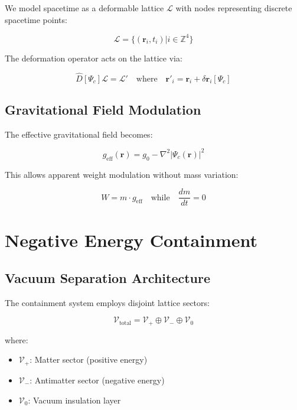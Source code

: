 \documentclass{article}
\begin{document}
We model spacetime as a deformable lattice $\mathcal{L}$ with nodes representing discrete spacetime points:

\begin{equation}
\mathcal{L} = \{(\mathbf{r}_i, t_i) | i \in \mathbb{Z}^4\}
\end{equation}

The deformation operator acts on the lattice via:

\begin{equation}
\hat{D}[\Psi_c]\mathcal{L} = \mathcal{L}' \quad \text{where} \quad \mathbf{r}'_i = \mathbf{r}_i + \delta\mathbf{r}_i[\Psi_c]
\end{equation}

\subsection{Gravitational Field Modulation}

The effective gravitational field becomes:

\begin{equation}
g_{\text{eff}}(\mathbf{r}) = g_0 - \nabla^2|\Psi_c(\mathbf{r})|^2
\end{equation}

This allows apparent weight modulation without mass variation:

\begin{equation}
W = m \cdot g_{\text{eff}} \quad \text{while} \quad \frac{dm}{dt} = 0
\end{equation}

\section{Negative Energy Containment}

\subsection{Vacuum Separation Architecture}

The containment system employs disjoint lattice sectors:

\begin{equation}
\mathcal{V}_{\text{total}} = \mathcal{V}_+ \oplus \mathcal{V}_- \oplus \mathcal{V}_0
\end{equation}

where:
\begin{itemize}
    \item $\mathcal{V}_+$: Matter sector (positive energy)
    \item $\mathcal{V}_-$: Antimatter sector (negative energy)
    \item $\mathcal{V}_0$: Vacuum insulation layer
\end{itemize}
\end{document}
